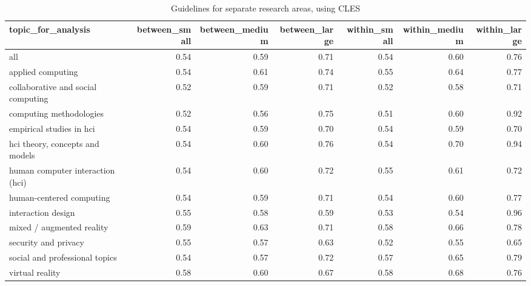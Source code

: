 \begin{table}[ht]
\centering
\begin{tabular}{lrrrrrr}
  \hline
topic\_for\_analysis & between\_small & between\_medium & between\_large & within\_small & within\_medium & within\_large \\ 
  \hline
all & 0.54 & 0.59 & 0.71 & 0.54 & 0.60 & 0.76 \\ 
  applied computing & 0.54 & 0.61 & 0.74 & 0.55 & 0.64 & 0.77 \\ 
  collaborative and social computing & 0.52 & 0.59 & 0.71 & 0.52 & 0.58 & 0.71 \\ 
  computing methodologies & 0.52 & 0.56 & 0.75 & 0.51 & 0.60 & 0.92 \\ 
  empirical studies in hci & 0.54 & 0.59 & 0.70 & 0.54 & 0.59 & 0.70 \\ 
  hci theory, concepts and models & 0.54 & 0.60 & 0.76 & 0.54 & 0.70 & 0.94 \\ 
  human computer interaction (hci) & 0.54 & 0.60 & 0.72 & 0.55 & 0.61 & 0.72 \\ 
  human-centered computing & 0.54 & 0.59 & 0.71 & 0.54 & 0.60 & 0.77 \\ 
  interaction design & 0.55 & 0.58 & 0.59 & 0.53 & 0.54 & 0.96 \\ 
  mixed / augmented reality & 0.59 & 0.63 & 0.71 & 0.58 & 0.66 & 0.78 \\ 
  security and privacy & 0.55 & 0.57 & 0.63 & 0.52 & 0.55 & 0.65 \\ 
  social and professional topics & 0.54 & 0.57 & 0.72 & 0.57 & 0.65 & 0.79 \\ 
  virtual reality & 0.58 & 0.60 & 0.67 & 0.58 & 0.68 & 0.76 \\ 
   \hline
\end{tabular}
\caption{Guidelines for separate research areas, using \ac{CLES}} 
\label{tab:es guidelines cles-es different topics}
\end{table}

